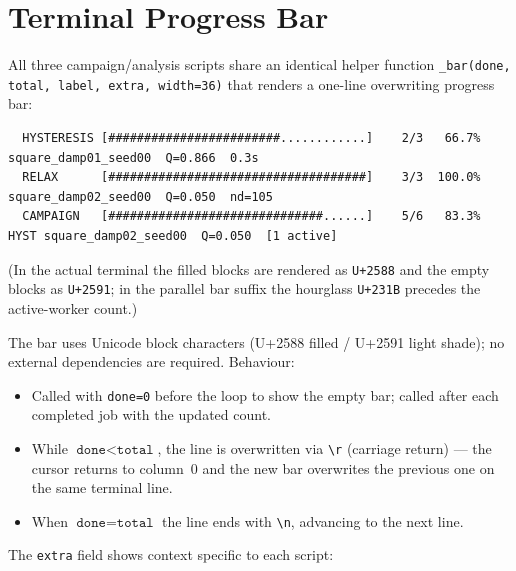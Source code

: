 \documentclass[11pt,a4paper]{article}
\newcommand{\code}[1]{\texttt{#1}}
\begin{document}
\section{Terminal Progress Bar}
\label{sec:progressbar}

All three campaign/analysis scripts share an identical helper function
\code{\_bar(done, total, label, extra, width=36)} that renders a
one-line overwriting progress bar:

\begin{lstlisting}
  HYSTERESIS [########################............]    2/3   66.7%  square_damp01_seed00  Q=0.866  0.3s
  RELAX      [####################################]    3/3  100.0%  square_damp02_seed00  Q=0.050  nd=105
  CAMPAIGN   [##############################......]    5/6   83.3%  HYST square_damp02_seed00  Q=0.050  [1 active]
\end{lstlisting}

\noindent (In the actual terminal the filled blocks are rendered as \texttt{U+2588} and the
empty blocks as \texttt{U+2591}; in the parallel bar suffix the hourglass \texttt{U+231B}
precedes the active-worker count.)

\noindent The bar uses Unicode block characters (U+2588 filled / U+2591 light shade);
no external dependencies are required.  Behaviour:
\begin{itemize}
  \item Called with \texttt{done=0} before the loop to show the empty bar;
    called after each completed job with the updated count.
  \item While $\texttt{done} < \texttt{total}$, the line is overwritten
    via \texttt{\textbackslash r} (carriage return) --- the cursor returns
    to column~0 and the new bar overwrites the previous one on the same
    terminal line.
  \item When $\texttt{done} = \texttt{total}$ the line ends with
    \texttt{\textbackslash n}, advancing to the next line.
\end{itemize}

\noindent The \texttt{extra} field shows context specific to each script:
\end{document}
